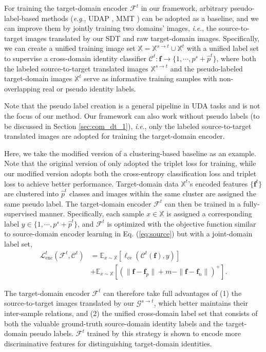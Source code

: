 \documentclass[journal]{IEEEtran}
\def\vf{{\bm{f}}}
\def\sX{{\mathbb{X}}}
\newcommand{\ie}{\textit{i}.\textit{e}., }
\newcommand{\eg}{\textit{e}.\textit{g}., }
\begin{document}
For training the target-domain encoder $\mathcal{F}^t$ in our framework,
arbitrary pseudo-label-based methods (\eg UDAP \cite{song2018unsupervised}, MMT \cite{ge2020mutual}) can be adopted as a baseline, and we can improve them by jointly training two domains' images, \ie the source-to-target images translated by our SDT and raw target-domain images.
Specifically,
we can create a unified training image set $\sX=\sX^{s\to t} \cup \sX^t$ with a unified label set to supervise a cross-domain identity classifier $\mathcal{C}^t:\vf\rightarrow\{1,\cdots, p^s+\hat{p}^t \}$,
where both the labeled source-to-target translated images $\sX^{s\to t}$ and the pseudo-labeled target-domain images $\sX^{t}$ serve as informative training samples with non-overlapping real or pseudo identity labels.

Note that the pseudo label creation is a general pipeline in UDA tasks and is not the focus of our method.
Our framework can also work without pseudo labels (to be discussed in Section \ref{sec:com_dt_1}), \ie only the labeled source-to-target translated images are adopted for training the target-domain encoder.


Here, we take  {the modified version of} a clustering-based baseline \cite{song2018unsupervised} as an example.  {Note that the original version of \cite{song2018unsupervised} only adopted the triplet loss for training, while our modified version adopts both the cross-entropy classification loss and triplet loss to achieve better performance.}
Target-domain data $\sX^t$'s encoded features $\{\vf^t\}$ are clustered into $\hat{p}^t$ classes and images within the same cluster are assigned the same pseudo label.
The target-domain encoder ${\mathcal{F}^t}$ can then be trained in a fully-supervised manner.
Specifically,
each sample $x \in \sX$ is assigned a corresponding label $y \in \{1,\cdots,p^s+\hat{p}^t\}$, and
${\mathcal{F}^t}$ is optimized with the objective function similar to source-domain encoder learning in Eq. (\ref{eq:source}) but with a joint-domain label set,
{
\begin{align}
\label{eq:pic}
\mathcal{L}_\text{enc}^t(\mathcal{F}^t,\mathcal{C}^t) &=
\mathbb{E}_{x \sim \sX}\left[ \ell_\text{ce} ( \mathcal{C}^t(\vf), y  )\right] \nonumber\\
&+
\mathbb{E}_{x \sim \sX}\left[
(\|\vf-\vf_p\| + m
 - \|\vf-\vf_n\| )^+\right].
\end{align}}


The target-domain encoder $\mathcal{F}^t$ can therefore take full advantages of
(1) the source-to-target images translated by our $\mathcal{G}^{s\to t}$, which better maintains their inter-sample relations, and
(2) the unified cross-domain label set that consists of both the valuable ground-truth source-domain identity labels and the target-domain pseudo labels.
$\mathcal{F}^t$ trained by this strategy is shown to encode more discriminative features for distinguishing target-domain identities.
\end{document}
